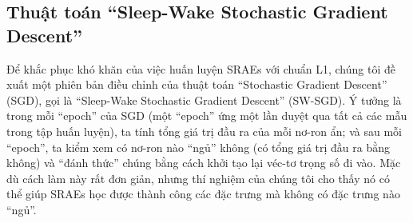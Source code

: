 \subsection{Thuật toán ``Sleep-Wake Stochastic Gradient Descent''}
Để khắc phục khó khăn của việc huấn luyện SRAEs với chuẩn L1, chúng tôi đề xuất một phiên bản điều chỉnh của thuật toán ``Stochastic Gradient Descent'' (SGD), gọi là ``Sleep-Wake Stochastic Gradient Descent'' (SW-SGD). Ý tưởng là trong mỗi ``epoch'' của SGD (một ``epoch'' ứng một lần duyệt qua tất cả các mẫu trong tập huấn luyện), ta tính tổng giá trị đầu ra của mỗi nơ-ron ẩn; và sau mỗi ``epoch'', ta kiểm xem có nơ-ron nào ``ngủ'' không (có tổng giá trị đầu ra bằng không) và ``đánh thức'' chúng bằng cách khởi tạo lại véc-tơ trọng số đi vào. Mặc dù cách làm này rất đơn giản, nhưng thí nghiệm của chúng tôi cho thấy nó có thể giúp SRAEs học được thành công các đặc trưng mà không có đặc trưng nào ``ngủ''.

